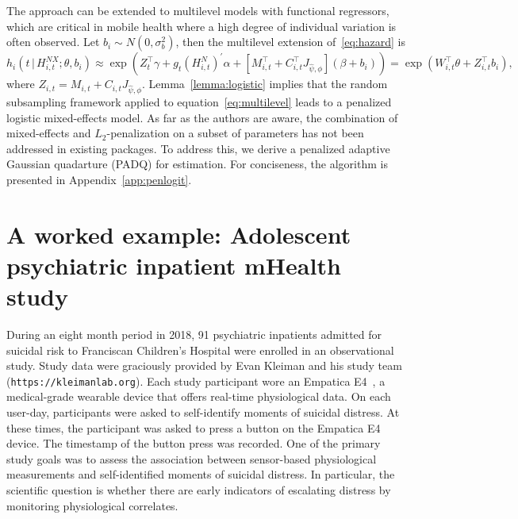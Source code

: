 \documentclass[12pt]{amsart}
\def\given{\, | \,}
\begin{document}
The approach can be extended to multilevel models with functional regressors, which are critical in mobile health where a high degree of individual variation is often observed.  Let $b_i \sim N(0, \sigma_{b}^2)$, then the multilevel extension of~\eqref{eq:hazard} is
\begin{equation}
\label{eq:multilevel}
h_i \left( t \given  H_{i,t}^{NX} ; \theta, b_i \right) \approx
\exp \left( Z_{t}^\top \gamma + g_t \left( H_{i,t}^{N} \right)^{\prime} \alpha
  + \left[ M_{i,t}^\top + C_{i,t}^\top J_{\hat \psi, \phi}\right] (\beta + b_i) \right)
= \exp \left( W_{i,t}^\top \theta  + Z_{i,t}^\top b_i \right),
\end{equation}
where $Z_{i,t} = M_{i,t} + C_{i,t} J_{\hat \psi, \phi}$. Lemma~\ref{lemma:logistic} implies that the random subsampling framework applied to equation~\eqref{eq:multilevel} leads to a penalized logistic mixed-effects model.  As far as the authors are aware, the combination of mixed-effects and $L_2$-penalization on a subset of parameters has not been addressed in existing packages.  To address this, we derive a penalized adaptive Gaussian quadarture (PADQ) for estimation.  For conciseness, the algorithm is presented in Appendix~\ref{app:penlogit}.

\section{A worked example: Adolescent psychiatric inpatient mHealth study} \label{section:example}

During an eight month period in 2018, 91 psychiatric inpatients admitted for suicidal risk to Franciscan Children's Hospital were enrolled in an observational study.  Study data were graciously provided by Evan Kleiman and his study team ({\tt https://kleimanlab.org}). Each study participant wore an Empatica E4~\citep{empaticae3}, a medical-grade wearable device that offers real-time physiological data.  On each user-day, participants were asked to self-identify moments of suicidal distress.  At these times, the participant was asked to press a button on the Empatica E4 device.  The timestamp of the button press was recorded.  One of the primary study goals was to assess the association between sensor-based physiological measurements and self-identified moments of suicidal distress. In particular, the scientific question is whether there are early indicators of escalating distress by monitoring physiological correlates.
\end{document}
